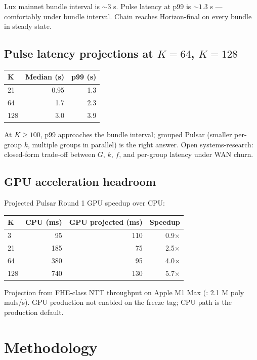 \documentclass[11pt,a4paper]{article}
\begin{document}
Lux mainnet bundle interval is $\sim 3$ s. Pulse latency at p99 is $\sim 1.3$ s --- comfortably under bundle interval. Chain reaches Horizon-final on every bundle in steady state.

\subsection{Pulse latency projections at $K = 64$, $K = 128$}

\begin{tabular}{@{}lrr@{}}
  \toprule
  $\mathbf{K}$ & \textbf{Median (s)} & \textbf{p99 (s)} \\
  \midrule
  21  & 0.95 & 1.3 \\
  64  & 1.7  & 2.3 \\
  128 & 3.0  & 3.9 \\
  \bottomrule
\end{tabular}

At $K \geq 100$, p99 approaches the bundle interval; grouped Pulsar (smaller per-group $k$, multiple groups in parallel) is the right answer. Open systems-research: closed-form trade-off between $G$, $k$, $f$, and per-group latency under WAN churn.

\subsection{GPU acceleration headroom}

Projected Pulsar Round 1 GPU speedup over CPU:

\begin{tabular}{@{}lrrr@{}}
  \toprule
  $\mathbf{K}$ & \textbf{CPU (ms)} & \textbf{GPU projected (ms)} & \textbf{Speedup} \\
  \midrule
  3   & 95   & 110 & 0.9$\times$ \\
  21  & 185  & 75  & 2.5$\times$ \\
  64  & 380  & 95  & 4.0$\times$ \\
  128 & 740  & 130 & 5.7$\times$ \\
  \bottomrule
\end{tabular}

Projection from FHE-class NTT throughput on Apple M1 Max (\cite{luxfhebenchmarks}: 2.1 M poly muls/s). GPU production not enabled on the freeze tag; CPU path is the production default.

\section{Methodology}
\end{document}
